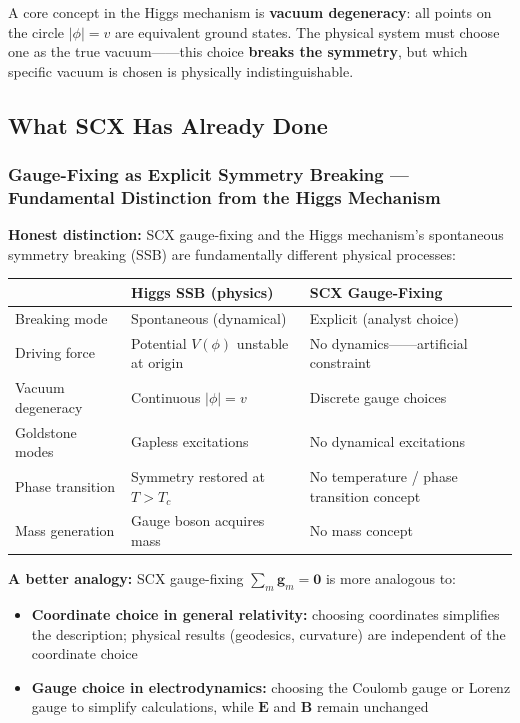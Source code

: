 \documentclass[12pt,a4paper]{article}
\theoremstyle{remark}
\newcommand{\gaugeparam}{\mathbf{g}}
\begin{document}
A core concept in the Higgs mechanism is \textbf{vacuum degeneracy}: all points on
the circle $|\phi| = v$ are equivalent ground states. The physical system must choose
one as the true vacuum——this choice \textbf{breaks the symmetry},
but which specific vacuum is chosen is physically indistinguishable.

\subsection{What SCX Has Already Done}

\subsubsection{Gauge-Fixing as Explicit Symmetry Breaking — Fundamental Distinction from the Higgs Mechanism}

\textbf{Honest distinction:} SCX gauge-fixing and the Higgs mechanism's spontaneous symmetry breaking (SSB)
are fundamentally different physical processes:

\begin{center}
\begin{tabular}{p{5cm} p{5cm} p{5cm}}
\toprule
& \textbf{Higgs SSB (physics)} & \textbf{SCX Gauge-Fixing} \\
\midrule
Breaking mode & Spontaneous (dynamical) & Explicit (analyst choice) \\
Driving force & Potential $V(\phi)$ unstable at origin & No dynamics——artificial constraint \\
Vacuum degeneracy & Continuous $|\phi| = v$ & Discrete gauge choices \\
Goldstone modes & Gapless excitations & No dynamical excitations \\
Phase transition & Symmetry restored at $T > T_c$ & No temperature / phase transition concept \\
Mass generation & Gauge boson acquires mass & No mass concept \\
\bottomrule
\end{tabular}
\end{center}

\textbf{A better analogy:} SCX gauge-fixing $\sum_m \gaugeparam_m = \mathbf{0}$ is more analogous to:
\begin{itemize}
    \item \textbf{Coordinate choice in general relativity:} choosing coordinates simplifies the description;
    physical results (geodesics, curvature) are independent of the coordinate choice
    \item \textbf{Gauge choice in electrodynamics:} choosing the Coulomb gauge or Lorenz gauge
    to simplify calculations, while $\mathbf{E}$ and $\mathbf{B}$ remain unchanged
\end{itemize}
\end{document}

